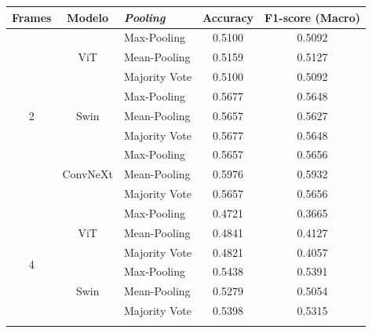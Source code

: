 \begin{table}[H]
    \centering
    \begin{tabular}{cclcc}
        \toprule
        \textbf{Frames} & \textbf{Modelo} & \textbf{\textit{Pooling}} & \textbf{Accuracy} & \textbf{F1-score (Macro)} \\
        \midrule
        
        \multirow{9}{*}{2} 
            & \multirow{3}{*}{ViT} 
                & Max-Pooling   & 0.5100 & 0.5092 \\
            &   & Mean-Pooling  & 0.5159 & 0.5127 \\
            &   & Majority Vote & 0.5100 & 0.5092 \\
            \cmidrule{2-5} %
            
            & \multirow{3}{*}{Swin} 
                & Max-Pooling   & 0.5677 & 0.5648 \\
            &   & Mean-Pooling  & 0.5657 & 0.5627 \\
            &   & Majority Vote & 0.5677 & 0.5648 \\
            \cmidrule{2-5}
            
            & \multirow{3}{*}{ConvNeXt} 
                & Max-Pooling   & 0.5657 & 0.5656 \\
            &   & Mean-Pooling  & 0.5976 & 0.5932 \\
            &   & Majority Vote & 0.5657 & 0.5656 \\
            
        \midrule
        \multirow{9}{*}{4} 
            & \multirow{3}{*}{ViT} 
                & Max-Pooling   & 0.4721 & 0.3665 \\
            &   & Mean-Pooling  & 0.4841 & 0.4127 \\
            &   & Majority Vote & 0.4821 & 0.4057 \\
            \cmidrule{2-5} %
            
            & \multirow{3}{*}{Swin} 
                & Max-Pooling   & 0.5438 & 0.5391 \\
            &   & Mean-Pooling  & 0.5279 & 0.5054 \\
            &   & Majority Vote & 0.5398 & 0.5315 \\
            \cmidrule{2-5}
            

\end{tabular}
\end{table}
